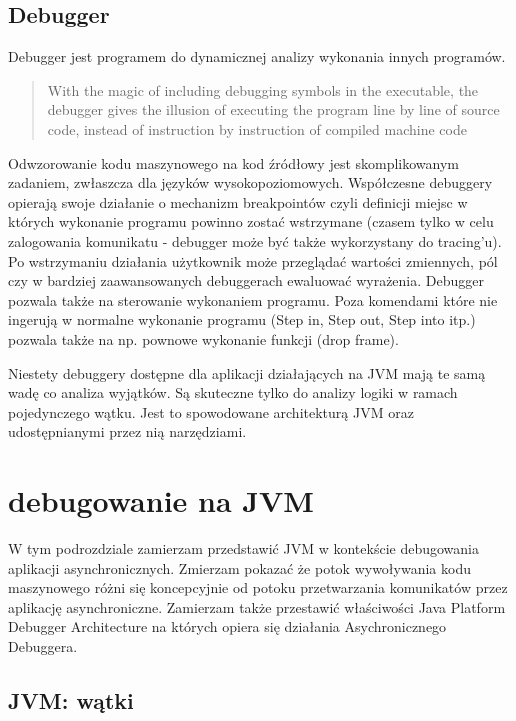 \subsection{Debugger}
Debugger jest programem do dynamicznej analizy wykonania innych programów. 
\begin{quote}
    With the magic of including debugging symbols in the executable, the debugger gives the illusion of executing the program line by line of source code, instead of instruction by instruction of compiled machine code~\cite{artOfDebugging}
\end{quote}
Odwzorowanie kodu maszynowego na kod źródłowy jest skomplikowanym zadaniem, zwłaszcza dla języków wysokopoziomowych. Współczesne debuggery opierają swoje działanie o mechanizm breakpointów czyli definicji miejsc w których wykonanie programu powinno zostać wstrzymane (czasem tylko w celu zalogowania komunikatu - debugger może być także wykorzystany do tracing'u). Po wstrzymaniu działania użytkownik może przeglądać wartości zmiennych, pól czy w bardziej zaawansowanych debuggerach ewaluować wyrażenia.
Debugger pozwala także na sterowanie wykonaniem programu. Poza komendami które nie ingerują w normalne wykonanie programu (Step in, Step out, Step into itp.) pozwala także na np. pownowe wykonanie funkcji (drop frame).

Niestety debuggery dostępne dla aplikacji działających na JVM mają te samą wadę co analiza wyjątków. Są skuteczne tylko do analizy logiki w ramach pojedynczego wątku. Jest to spowodowane architekturą JVM oraz udostępnianymi przez nią narzędziami.


\section{debugowanie na JVM}

W tym podrozdziale zamierzam przedstawić JVM w kontekście debugowania aplikacji asynchronicznych. Zmierzam pokazać że potok wywoływania kodu maszynowego różni się koncepcyjnie od potoku przetwarzania komunikatów przez aplikację asynchroniczne. Zamierzam także przestawić właściwości Java Platform Debugger Architecture na których opiera się działania Asychronicznego Debuggera.

\subsection{JVM: wątki}

